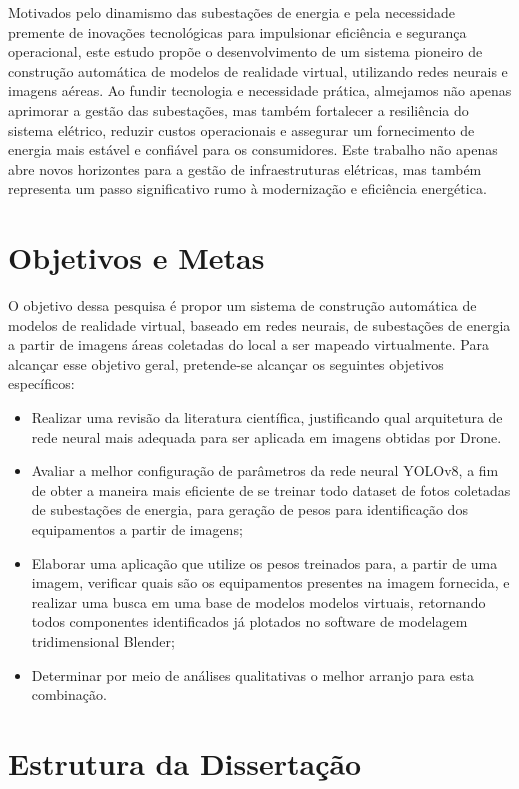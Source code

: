 Motivados pelo dinamismo das subestações de energia e pela necessidade premente de inovações tecnológicas para impulsionar eficiência e segurança operacional, este estudo propõe o desenvolvimento de um sistema pioneiro de construção automática de modelos de realidade virtual, utilizando redes neurais e imagens aéreas. Ao fundir tecnologia e necessidade prática, almejamos não apenas aprimorar a gestão das subestações, mas também fortalecer a resiliência do sistema elétrico, reduzir custos operacionais e assegurar um fornecimento de energia mais estável e confiável para os consumidores. Este trabalho não apenas abre novos horizontes para a gestão de infraestruturas elétricas, mas também representa um passo significativo rumo à modernização e eficiência energética.


\section{Objetivos e Metas}

O objetivo dessa pesquisa é propor um sistema de construção automática de modelos de realidade virtual, baseado em redes neurais, de subestações de energia a partir  de imagens áreas coletadas do local a ser mapeado virtualmente. Para alcançar esse objetivo geral, pretende-se alcançar os seguintes objetivos específicos:
\begin{itemize}
\item Realizar uma revisão da literatura científica, justificando qual arquitetura de rede neural mais adequada para ser aplicada em imagens obtidas por Drone.
\item Avaliar a melhor configuração de parâmetros da rede neural YOLOv8, a fim de obter a maneira mais eficiente de se treinar todo dataset de fotos coletadas de subestações de energia, para geração de pesos para identificação dos equipamentos a partir de imagens;
\item Elaborar uma aplicação que utilize os pesos treinados para, a partir de uma imagem, verificar quais são os equipamentos presentes na imagem fornecida, e realizar uma busca em uma base de modelos modelos virtuais, retornando todos componentes identificados já plotados no software de modelagem tridimensional Blender;
\item Determinar por meio de análises qualitativas o melhor arranjo para esta combinação.
\end{itemize}

\section{Estrutura da Dissertação}

